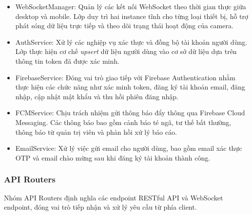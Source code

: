 \begin{itemize}
\item WebSocketManager: Quản lý các kết nối WebSocket theo thời gian thực giữa desktop và mobile. Lớp duy trì hai instance tĩnh cho từng loại thiết bị, hỗ trợ phát sóng dữ liệu trực tiếp và theo dõi trạng thái hoạt động của camera.

\item AuthService: Xử lý các nghiệp vụ xác thực và đồng bộ tài khoản người dùng. Lớp thực hiện cơ chế \textit{upsert} dữ liệu người dùng vào cơ sở dữ liệu dựa trên thông tin token đã được xác minh.

\item FirebaseService: Đóng vai trò giao tiếp với Firebase Authentication nhằm thực hiện các chức năng như xác minh token, đăng ký tài khoản email, đăng nhập, cập nhật mật khẩu và thu hồi phiên đăng nhập.

\item FCMService: Chịu trách nhiệm gửi thông báo đẩy thông qua Firebase Cloud Messaging. Các thông báo bao gồm cảnh báo té ngã, tư thế bất thường, thông báo từ quản trị viên và phản hồi xử lý báo cáo.

\item EmailService: Xử lý việc gửi email cho người dùng, bao gồm email xác thực OTP và email chào mừng sau khi đăng ký tài khoản thành công.

\end{itemize}

\subsubsection*{API Routers}

Nhóm API Routers định nghĩa các endpoint RESTful API và WebSocket endpoint, đóng vai trò tiếp nhận và xử lý yêu cầu từ phía client.

